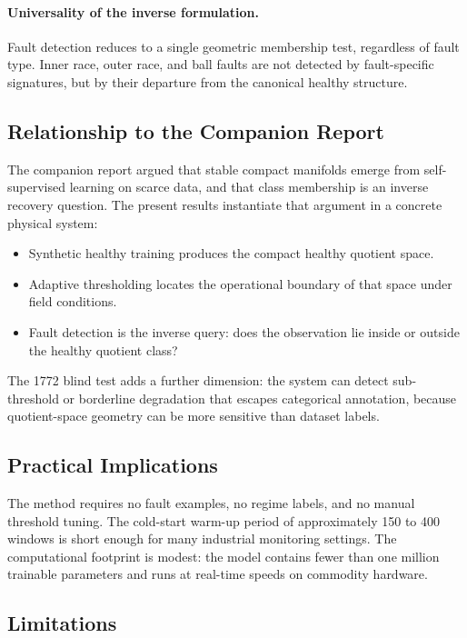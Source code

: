 \documentclass[11pt]{article}
\begin{document}
\paragraph{Universality of the inverse formulation.}
Fault detection reduces to a single geometric membership test, regardless of fault type. Inner race, outer race, and ball faults are not detected by fault-specific signatures, but by their departure from the canonical healthy structure.

\subsection{Relationship to the Companion Report}

The companion report argued that stable compact manifolds emerge from self-supervised learning on scarce data, and that class membership is an inverse recovery question. The present results instantiate that argument in a concrete physical system:

\begin{itemize}
    \item Synthetic healthy training produces the compact healthy quotient space.
    \item Adaptive thresholding locates the operational boundary of that space under field conditions.
    \item Fault detection is the inverse query: does the observation lie inside or outside the healthy quotient class?
\end{itemize}

The 1772 blind test adds a further dimension: the system can detect sub-threshold or borderline degradation that escapes categorical annotation, because quotient-space geometry can be more sensitive than dataset labels.

\subsection{Practical Implications}

The method requires no fault examples, no regime labels, and no manual threshold tuning. The cold-start warm-up period of approximately 150 to 400 windows is short enough for many industrial monitoring settings. The computational footprint is modest: the model contains fewer than one million trainable parameters and runs at real-time speeds on commodity hardware.

\subsection{Limitations}
\end{document}

